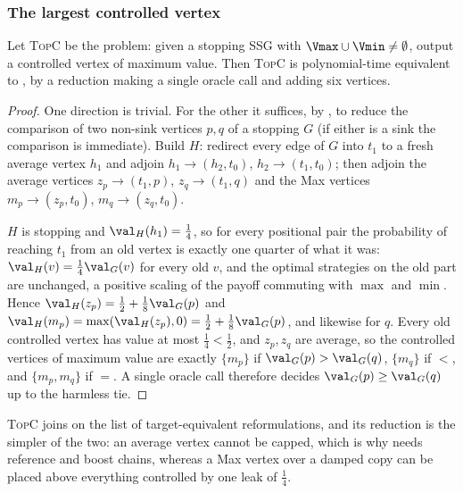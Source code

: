 \subsubsection*{The largest controlled vertex}

\begin{theorem}\label{thm:fs16-topctrl}
Let \textsc{TopC} be the problem: given a stopping SSG with
$\Vmax\cup\Vmin\ne\emptyset$, output a controlled vertex of maximum value. Then
\textsc{TopC} is polynomial-time equivalent to , by a reduction
making a single oracle call and adding six vertices.
\end{theorem}

\begin{proof}
One direction is trivial. For the other it suffices, by
, to reduce the comparison of two non-sink
vertices $p,q$ of a stopping $G$ (if either is a sink the comparison is
immediate). Build $H$: redirect every edge of $G$ into
$t_1$ to a fresh average vertex $h_1$ and adjoin $h_1\to(h_2,t_0)$,
$h_2\to(t_1,t_0)$; then adjoin the average vertices $z_p\to(t_1,p)$,
$z_q\to(t_1,q)$ and the Max vertices $m_p\to(z_p,t_0)$, $m_q\to(z_q,t_0)$.

$H$ is stopping and $\val_H(h_1)=\tfrac14$, so for every positional pair the
probability of reaching $t_1$ from an old vertex is exactly one quarter of what
it was: $\val_H(v)=\tfrac14\val_G(v)$ for every old $v$, and the optimal
strategies on the old part are unchanged, a positive scaling of the payoff
commuting with $\max$ and $\min$. Hence
$\val_H(z_p)=\tfrac12+\tfrac18\val_G(p)$ and
$\val_H(m_p)=\max(\val_H(z_p),0)=\tfrac12+\tfrac18\val_G(p)$, and likewise for
$q$. Every old controlled vertex has value at most $\tfrac14<\tfrac12$, and
$z_p,z_q$ are average, so the controlled vertices of maximum value are exactly
$\{m_p\}$ if $\val_G(p)>\val_G(q)$, $\{m_q\}$ if $<$, and $\{m_p,m_q\}$ if $=$.
A single oracle call therefore decides $\val_G(p)\ge\val_G(q)$ up to the
harmless tie.
\end{proof}

\begin{remark}
\textsc{TopC} joins  on the list of target-equivalent
reformulations, and its reduction is the simpler of the two: an average vertex
cannot be capped, which is why  needs reference and boost chains,
whereas a Max vertex over a damped copy can be placed above everything
controlled by one leak of $\tfrac14$.
\end{remark}

